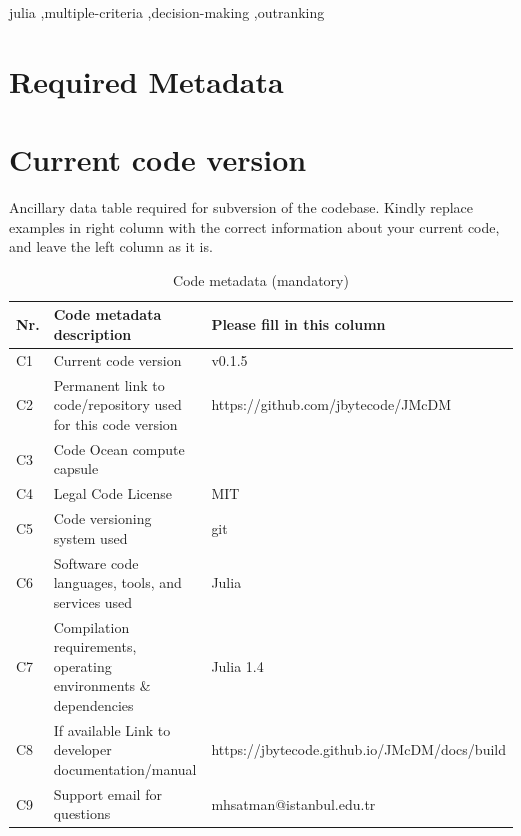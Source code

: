 \documentclass[preprint,review, 12pt, a4paper]{elsarticle}
\begin{document}
\begin{frontmatter}
\begin{abstract}
\end{abstract}

\begin{keyword}
julia  \sep multiple-criteria \sep decision-making \sep outranking



\end{keyword}

\end{frontmatter}

\section*{Required Metadata}
\label{required_metadata}

\section*{Current code version}
\label{section:current_code_version}

Ancillary data table required for subversion of the codebase. Kindly replace examples in right column with the correct information about your current code, and leave the left column as it is.

\begin{table}[H]
\begin{tabular}{|l|p{6.5cm}|p{6.5cm}|}
\hline
\textbf{Nr.} & \textbf{Code metadata description} & \textbf{Please fill in this column} \\
\hline
C1 & Current code version & v0.1.5\\
\hline
C2 & Permanent link to code/repository used for this code version & https://github.com/jbytecode/JMcDM \\
\hline
C3 & Code Ocean compute capsule & %
\\
\hline
C4 & Legal Code License   & MIT\\
\hline
C5 & Code versioning system used & git \\
\hline
C6 & Software code languages, tools, and services used & Julia \\
\hline
C7 & Compilation requirements, operating environments \& dependencies & Julia 1.4 \\
\hline
C8 & If available Link to developer documentation/manual & https://jbytecode.github.io/JMcDM/docs/build \\
\hline
C9 & Support email for questions & mhsatman@istanbul.edu.tr\\
\hline
\end{tabular}
\caption{Code metadata (mandatory)}
\label{code_metadata_mandatory} 
\end{table}
\end{document}
